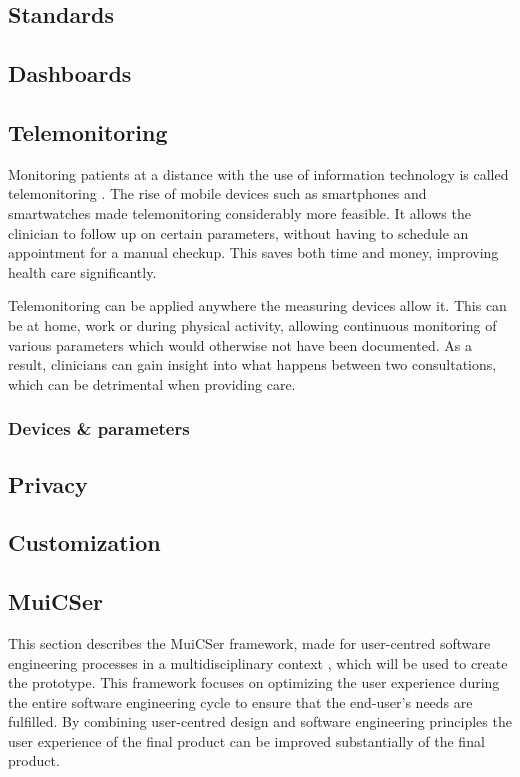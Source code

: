     \subsection{Standards} \label{2_standards}

    \subsection{Dashboards}


    \subsection{Telemonitoring} \label{2_telemonitoring}
    Monitoring patients at a distance with the use of information technology is called telemonitoring \cite{telemonitoring_definition}. The rise of mobile devices such as smartphones and smartwatches made telemonitoring considerably more feasible. It allows the clinician to follow up on certain parameters, without having to schedule an appointment for a manual checkup. This saves both time and money, improving health care significantly.
    
    Telemonitoring can be applied anywhere the measuring devices allow it. This can be at home, work or during physical activity, allowing continuous monitoring of various parameters which would otherwise not have been documented. As a result, clinicians can gain insight into what happens between two consultations, which can be detrimental when providing care.
    
        \subsubsection{Devices \& parameters}

        



    \subsection{Privacy}

    \subsection{Customization}

    \subsection{MuiCSer} \label{2_muicser}
    This section describes the MuiCSer framework, made for user-centred software engineering processes in a multidisciplinary context \cite{muicser}, which will be used to create the prototype. This framework focuses on optimizing the user experience during the entire software engineering cycle to ensure that the end-user's needs are fulfilled. By combining user-centred design and software engineering principles the user experience of the final product can be improved substantially of the final product.

